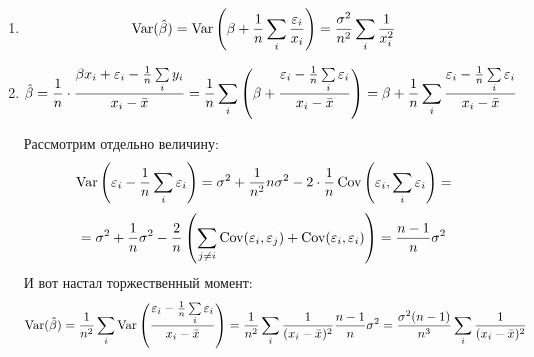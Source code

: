 \begin{problem}
\begin{sol}
\begin{enumerate}
 \item
 \[
 \operatorname{Var}(\hat{\beta}) = \operatorname{Var}\left(\beta + \frac{1}{n}\sum\limits_i\frac{\varepsilon_i}{x_i}\right) = \frac{\sigma^2}{n^2}\sum\limits_i \frac{1}{x_i^2}
 \]

 \item
 \[
 \hat{\beta} = \frac{1}{n}\cdot \frac{\beta x_i + \varepsilon_i - \frac{1}{n}\sum\limits_i y_i}{x_i -\bar{x}} = \frac{1}{n}\sum\limits_i\left(\beta + \frac{\varepsilon_i-\frac{1}{n}\sum\limits_i\varepsilon_i}{x_i-\bar{x}}\right) = \beta + \frac{1}{n}\sum\limits_i \frac{\varepsilon_i-\frac{1}{n}\sum\limits_i\varepsilon_i}{x_i -\bar{x}}
 \]

 Рассмотрим отдельно величину:
 \[
 \operatorname{Var}\left(\varepsilon_i -\frac{1}{n}\sum\limits_i \varepsilon_i\right) = \sigma^2 + \frac{1}{n^2}n\sigma^2 - 2\cdot\frac{1}{n}\operatorname{Cov}\left(\varepsilon_i, \sum\limits_i \varepsilon_i\right) =
 \]
 \[
 = \sigma^2 + \frac{1}{n}\sigma^2 - \frac{2}{n}\left(\sum\limits_{j\ne i} \operatorname{Cov}(\varepsilon_i, \varepsilon_j) + \operatorname{Cov}(\varepsilon_i, \varepsilon_i)\right) = \frac{n-1}{n}\sigma^2
 \]
 И вот настал торжественный момент:
 \[
 \operatorname{Var}(\hat{\beta}) = \frac{1}{n^2}\sum\limits_i \operatorname{Var}\left(\frac{\varepsilon_i - \frac{1}{n} \sum\limits_i \varepsilon_i}{x_i -\bar{x}} \right) = \frac{1}{n^2}\sum\limits_i \frac{1}{(x_i-\bar{x})^2}\frac{n-1}{n}\sigma^2 = \frac{\sigma^2(n-1)}{n^3}\sum\limits_i \frac{1}{(x_i-\bar{x})^2}
 \]

 \end{enumerate}
\end{sol}
\end{problem}




